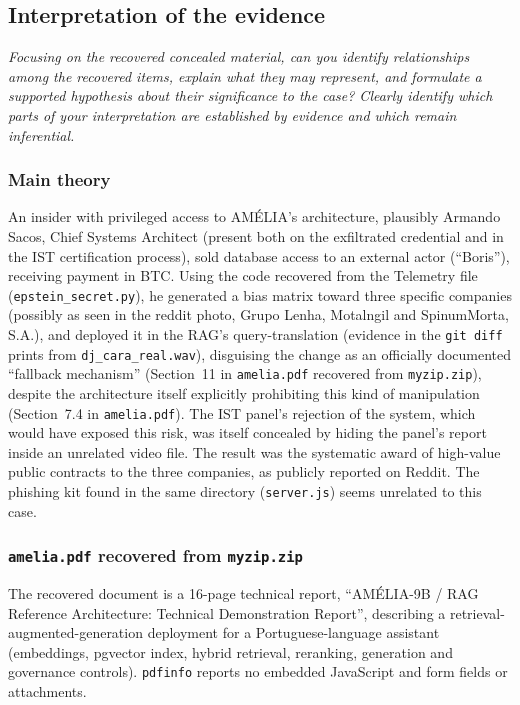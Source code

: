 \documentclass[11pt,a4paper,final,oneside]{article}
\begin{document}
\subsection{Interpretation of the evidence}

\textit{Focusing on the recovered concealed material, can you identify relationships among the recovered items, explain what they may represent, and formulate a supported hypothesis about their significance to the case? Clearly identify which parts of your interpretation are established by evidence and which remain inferential.}

\subsubsection*{Main theory}

An insider with privileged access to AMÉLIA's architecture, plausibly Armando Sacos, Chief Systems Architect (present both on the exfiltrated credential and in the IST certification process), sold database access to an external actor (``Boris''), receiving payment in BTC. Using the code recovered from the Telemetry file (\texttt{epstein\_secret.py}), he generated a bias matrix toward three specific companies (possibly as seen in the reddit photo, Grupo Lenha, Motalngil and SpinumMorta, S.A.), and deployed it in the RAG's query-translation (evidence in the \texttt{git diff} prints from \texttt{dj\_cara\_real.wav}), disguising the change as an officially documented ``fallback mechanism'' (Section~11 in \texttt{amelia.pdf} recovered from \texttt{myzip.zip}), despite the architecture itself explicitly prohibiting this kind of manipulation (Section~7.4 in \texttt{amelia.pdf}). The IST panel's rejection of the system, which would have exposed this risk, was itself concealed by hiding the panel's report inside an unrelated video file. The result was the systematic award of high-value public contracts to the three companies, as publicly reported on Reddit. The phishing kit found in the same directory (\texttt{server.js}) seems unrelated to this case.

\subsubsection*{\texttt{amelia.pdf} recovered from \texttt{myzip.zip}}

The recovered document is a 16-page technical report, ``AMÉLIA-9B / RAG Reference Architecture: Technical Demonstration Report'', describing a retrieval-augmented-generation deployment for a Portuguese-language assistant (embeddings, pgvector index, hybrid retrieval, reranking, generation and governance controls). \texttt{pdfinfo} reports no embedded JavaScript and form fields or attachments.
\end{document}
